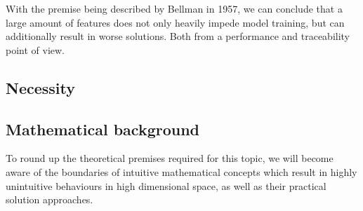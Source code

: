 With the premise being described by Bellman in 1957, we can conclude that a large amount of features does not only heavily impede model training, but can additionally result in worse solutions. \cite{HandsOnMLCh8}
Both from a performance and traceability point of view.

\clearpage

\subsection{Necessity}
\subsection{Mathematical background}

To round up the theoretical premises required for this topic, we will become aware of the boundaries of intuitive mathematical concepts which result in highly unintuitive behaviours in high dimensional space, as well as their practical solution approaches.

